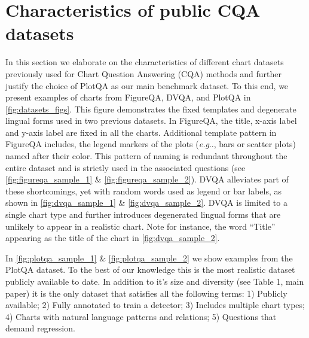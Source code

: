 \documentclass[runningheads]{llncs}
\makeatletter
\DeclareRobustCommand\onedot{\futurelet\@let@token\@onedot}
\def\@onedot{\ifx\@let@token.\else.\null\fi\xspace}
\def\eg{\emph{e.g}\onedot} \def\Eg{\emph{E.g}\onedot}
\makeatother
\begin{document}
\section{Characteristics of public CQA datasets}
\label{sec:public_cqa}
In this section we elaborate on the characteristics of different chart datasets previously used for Chart Question Answering (CQA) methods and further justify the choice of PlotQA as our main benchmark dataset. To this end, we present examples of charts from FigureQA, DVQA, and PlotQA in \cref{fig:datasets_figs}. This figure demonstrates the fixed templates and degenerate lingual forms used in two previous datasets. In FigureQA, the title, x-axis label and y-axis label are fixed in all the charts. Additional template pattern in FigureQA includes, the legend markers of the plots (\eg, bars or scatter plots) named after their color. This pattern of naming is redundant throughout the entire dataset and is strictly used in the associated questions (see \cref{fig:figureqa_sample_1} \& \ref{fig:figureqa_sample_2}). DVQA alleviates part of these shortcomings, yet with random words used as legend or bar labels, as shown in \cref{fig:dvqa_sample_1} \& \ref{fig:dvqa_sample_2}. DVQA is limited to a single chart type and further introduces degenerated lingual forms that are unlikely to appear in a realistic chart. Note for instance, the word ``Title'' appearing as the title of the chart in \cref{fig:dvqa_sample_2}.

In \cref{fig:plotqa_sample_1} \& \ref{fig:plotqa_sample_2} we show examples from the PlotQA dataset.
To the best of our knowledge this is the most realistic dataset publicly available to date. In addition to it's size and diversity (see Table 1, main paper) it is the only dataset that satisfies all the following terms: 1) Publicly available; 2) Fully annotated to train a detector; 3) Includes multiple chart types; 4) Charts with natural language patterns and relations; 5) Questions that demand regression.
\end{document}
